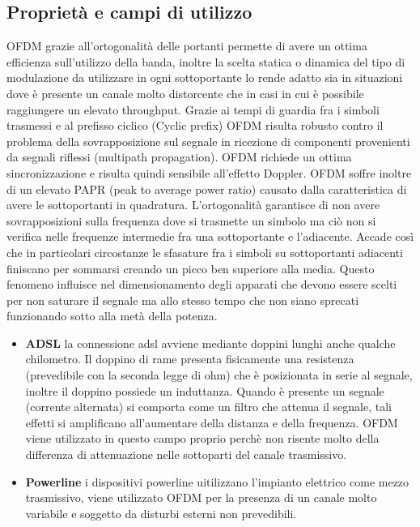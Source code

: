 \begin{itemize}
\subsection{Proprietà e campi di utilizzo}
OFDM grazie all'ortogonalità delle portanti permette di avere un ottima efficienza sull'utilizzo della banda, inoltre la scelta statica o dinamica del tipo di modulazione da utilizzare in ogni sottoportante lo rende adatto sia in situazioni dove è presente un canale molto distorcente che in casi in cui è possibile raggiungere un elevato throughput. Grazie ai tempi di guardia fra i simboli trasmessi e al prefisso ciclico (Cyclic prefix) OFDM risulta robusto contro il problema della sovrapposizione sul segnale in ricezione di componenti provenienti da segnali riflessi (multipath propagation). OFDM richiede un ottima sincronizzazione e risulta quindi sensibile all'effetto Doppler. OFDM soffre inoltre di un elevato PAPR (peak to average power ratio) causato dalla caratteristica di avere le sottoportanti in quadratura. L'ortogonalità garantisce di non avere sovrapposizioni sulla frequenza dove si trasmette un simbolo ma ciò non si verifica nelle frequenze intermedie fra una sottoportante e l'adiacente. Accade così che in particolari circostanze le sfasature fra i simboli su sottoportanti adiacenti finiscano per sommarsi creando un picco ben superiore alla media. Questo fenomeno influisce nel dimensionamento degli apparati che devono essere scelti per non saturare il segnale ma allo stesso tempo che non siano sprecati funzionando sotto alla metà della potenza.
\cite{papr}
\begin{itemize}
	\item \textbf{ADSL} la connessione adsl avviene mediante doppini lunghi anche qualche chilometro. Il doppino di rame presenta fisicamente una resistenza (prevedibile con la seconda legge di ohm) che è posizionata in serie al segnale, inoltre il doppino possiede un induttanza. Quando è presente un segnale (corrente alternata) si comporta come un filtro che attenua il segnale, tali effetti si amplificano all'aumentare della distanza e della frequenza. OFDM viene utilizzato in questo campo proprio perchè non risente molto della differenza di attenuazione nelle sottoparti del canale trasmissivo.
\end{itemize}
\begin{itemize}
	\item \textbf{Powerline} i dispositivi powerline uitilizzano l'impianto elettrico come mezzo trasmissivo, viene utilizzato OFDM per la presenza di un canale molto variabile e soggetto da disturbi esterni non prevedibili.

\end{itemize}
\end{itemize}
